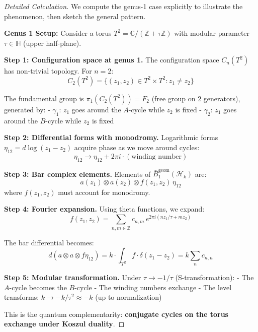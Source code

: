 \begin{proof}[Detailed Calculation]
We compute the genus-1 case explicitly to illustrate the phenomenon, then sketch the general pattern.

\textbf{Genus 1 Setup:}
Consider a torus $T^2 = \mathbb{C}/(\mathbb{Z} + \tau\mathbb{Z})$ with modular parameter $\tau \in \mathbb{H}$ (upper half-plane).

\textbf{Step 1: Configuration space at genus 1.}
The configuration space $C_n(T^2)$ has non-trivial topology. For $n=2$:
$$C_2(T^2) = \{(z_1,z_2) \in T^2 \times T^2 : z_1 \neq z_2\}$$

The fundamental group is $\pi_1(C_2(T^2)) = F_2$ (free group on 2 generators), generated by:
- $\gamma_1$: $z_1$ goes around the $A$-cycle while $z_2$ is fixed
- $\gamma_2$: $z_1$ goes around the $B$-cycle while $z_2$ is fixed

\textbf{Step 2: Differential forms with monodromy.}
Logarithmic forms $\eta_{12} = d\log(z_1-z_2)$ acquire phase as we move around cycles:
$$\eta_{12} \to \eta_{12} + 2\pi i \cdot (\text{winding number})$$

\textbf{Step 3: Bar complex elements.}
Elements of $\bar{B}_1^{\text{geom}}(\mathcal{H}_k)$ are:
$$a(z_1) \otimes a(z_2) \otimes f(z_1,z_2) \, \eta_{12}$$
where $f(z_1, z_2)$ must account for monodromy.

\textbf{Step 4: Fourier expansion.}
Using theta functions, we expand:
$$f(z_1,z_2) = \sum_{n,m \in \mathbb{Z}} c_{n,m} \, e^{2\pi i(n z_1/\tau + m z_2)}$$

The bar differential becomes:
$$d(a \otimes a \otimes f\eta_{12}) = k \cdot \int_{T^2} f \cdot \delta(z_1-z_2) = k \sum_{n} c_{n,n}$$

\textbf{Step 5: Modular transformation.}
Under $\tau \to -1/\tau$ (S-transformation):
- The $A$-cycle becomes the $B$-cycle
- The winding numbers exchange
- The level transforms: $k \to -k/\tau^2 \approx -k$ (up to normalization)

This is the quantum complementarity: \textbf{conjugate cycles on the torus exchange under Koszul duality}.
\end{proof}

